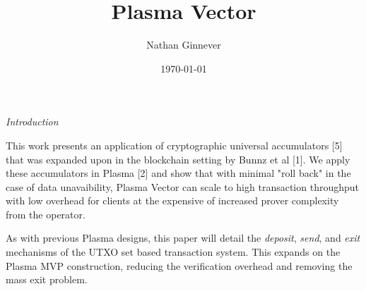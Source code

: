 \documentclass[11pt]{article}
\title{Plasma Vector}
\author{Nathan Ginnever}
\date{\today}
\begin{document}
\maketitle
\centerline{\textit{Introduction}}

This work presents an application of cryptographic universal accumulators [5] that was expanded upon in the blockchain setting by Bunnz et al [1]. We apply these accumulators in Plasma [2] and show that with minimal "roll back" in the case of data unavaibility, Plasma Vector can scale to high transaction throughput with low overhead for clients at the expensive of increased prover complexity from the operator.

As with previous Plasma designs, this paper will detail the \textit{deposit}, \textit{send}, and \textit{exit} mechanisms of the UTXO set based transaction system. This expands on the Plasma MVP construction, reducing the verification overhead and removing the mass exit problem.
\end{document}

